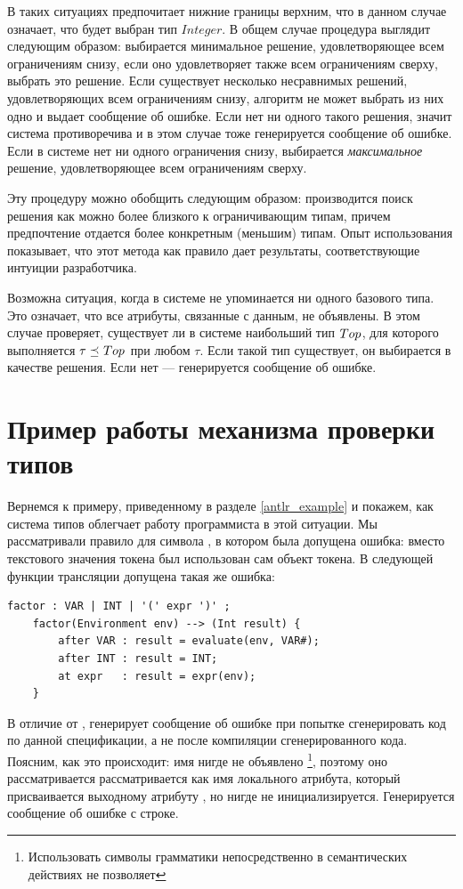 В таких ситуациях \ATF{} предпочитает нижние границы верхним, что в данном случае означает, что будет выбран тип $Integer$. В общем случае процедура выглядит следующим образом: выбирается минимальное решение, удовлетворяющее всем ограничениям снизу, если оно удовлетворяет также всем ограничениям сверху, выбрать это решение. Если существует несколько несравнимых решений, удовлетворяющих всем ограничениям снизу, алгоритм не может выбрать из них одно и выдает сообщение об ошибке. Если нет ни одного такого решения, значит система противоречива и в этом случае тоже генерируется сообщение об ошибке. Если в системе нет ни одного ограничения снизу, выбирается \emph{максимальное} решение, удовлетворяющее всем ограничениям сверху.

Эту процедуру можно обобщить следующим образом: производится поиск решения как можно более близкого к ограничивающим типам, причем предпочтение отдается более конкретным (меньшим) типам. Опыт использования \ATF{} показывает, что этот метода как правило дает результаты, соответствующие интуиции разработчика.

Возможна ситуация, когда в системе не упоминается ни одного базового типа. Это означает, что все атрибуты, связанные с данным, не объявлены. В этом случае \ATF{} проверяет, существует ли в системе наибольший тип $Top_{}$, для которого выполняется $\tau \preceq_{} Top_{}$ при любом $\tau$. Если такой тип существует, он выбирается в качестве решения. Если нет --- генерируется сообщение об ошибке.

\section{Пример работы механизма проверки типов}
Вернемся к примеру, приведенному в разделе \ref{antlr_example} и покажем, как система типов \ATF{} облегчает работу программиста в этой ситуации. Мы рассматривали правило для символа , в котором была допущена ошибка: вместо текстового значения токена  был использован сам объект токена. В следующей функции трансляции допущена такая же ошибка:
\begin{lstlisting}
factor : VAR | INT | '(' expr ')' ;          
	factor(Environment env) --> (Int result) { 
		after VAR : result = evaluate(env, VAR#);  
		after INT : result = INT;
		at expr   : result = expr(env);           
	}
\end{lstlisting}
В отличие от , \ATF{} генерирует сообщение об ошибке при попытке сгенерировать код по данной спецификации, а не после компиляции сгенерированного кода. Поясним, как это происходит: имя  нигде не объявлено \footnote{Использовать символы грамматики непосредственно в семантических действиях \ATF{} не позволяет}, поэтому оно рассматривается рассматривается как имя локального атрибута, который присваивается выходному атрибуту , но нигде не инициализируется. Генерируется сообщение об ошибке с строке.

